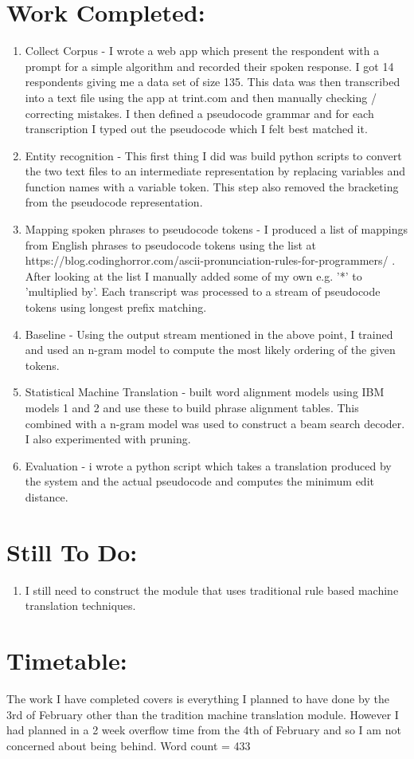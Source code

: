 \documentclass[12pt]{article}
\begin{document}
\section{Work Completed:}
\begin{enumerate}
\item Collect Corpus - I wrote a web app which present the respondent with a prompt for a simple algorithm and recorded their spoken response. I got 14 respondents giving me a data set of size 135. This data was then transcribed into a text file using the app at trint.com and then manually checking / correcting mistakes. I then defined a pseudocode grammar and  for each transcription I typed out the pseudocode which I felt best matched it. 
\item Entity recognition - This first thing I did was build python scripts to convert the two text files to an intermediate representation by replacing variables and function names with a variable token. This step also removed the bracketing from the pseudocode representation.
\item Mapping spoken phrases to pseudocode tokens - I produced a list of mappings from English phrases to pseudocode tokens using the list at https://blog.codinghorror.com/ascii-pronunciation-rules-for-programmers/ . After looking at the list I manually added some of my own e.g. '*' to 'multiplied by'. Each transcript was processed to a stream of pseudocode tokens using longest prefix matching.
\item Baseline - Using the output stream mentioned in the above point, I trained and used an n-gram model to compute the most likely ordering of the given tokens.
\item Statistical Machine Translation - built word alignment models using IBM models 1 and 2 and use these to build phrase alignment tables. This combined with a n-gram model was used to construct a beam search decoder. I also experimented with pruning.
\item Evaluation - i wrote a python script which takes a translation produced by the system and the actual pseudocode and computes the minimum edit distance.
\end{enumerate}

\section{Still To Do:}
\begin{enumerate}
\item I still need to construct the module that uses traditional rule based machine translation techniques.
\end{enumerate}

\section{Timetable: }
The work I have completed covers is everything I planned to have done by the 3rd of February other than the tradition machine translation module. However I had planned in a 2 week overflow time from the 4th of February and so I am not concerned about being behind.
\break 
\break 
\break 
Word count = 433
\end{document}
